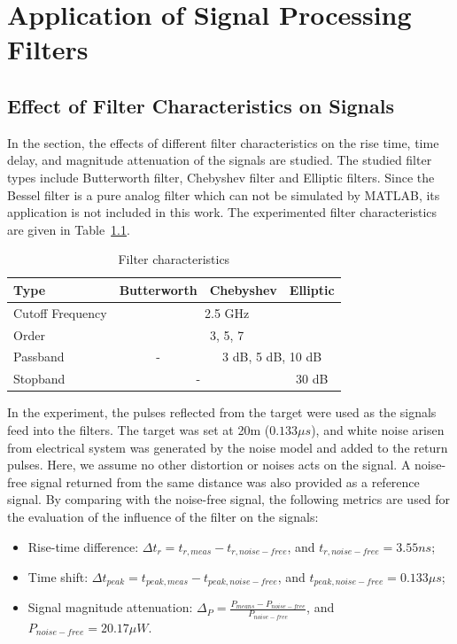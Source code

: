 \chapter{Application of Signal Processing Filters}\label{ch:AFE}
\section{Effect of Filter Characteristics on Signals}
In the section, the effects of different filter characteristics on the rise time, time delay, and magnitude attenuation of the signals are studied. The studied filter types include Butterworth filter, Chebyshev filter and Elliptic filters. Since the Bessel filter is a pure analog filter which can not be simulated by MATLAB, its application is not included in this work. The experimented filter characteristics are given in Table~\ref{table:AFE_filterParam}. 
%
\begin{table}[]
\centering
\caption{Filter characteristics}
\label{table:AFE_filterParam}
\begin{tabular}{|l|c|l|l|}
\hline
Type & \multicolumn{1}{l|}{Butterworth} & Chebyshev & Elliptic \\ \hline
Cutoff Frequency & \multicolumn{3}{c|}{2.5 GHz} \\ \hline
Order & \multicolumn{3}{c|}{3, 5, 7} \\ \hline
Passband & - & \multicolumn{2}{c|}{3 dB, 5 dB, 10 dB} \\ \hline
Stopband & \multicolumn{2}{c|}{-} & \multicolumn{1}{c|}{30 dB} \\ \hline
\end{tabular}
\end{table}
%
In the experiment, the pulses reflected from the target were used as the signals feed into the filters. The target was set at 20m ($0.133\mu s$), and white noise arisen from electrical system was generated by the noise model and added to the return pulses. Here, we assume no other distortion or noises acts on the signal. A noise-free signal returned from the same distance was also provided as a reference signal. By comparing with the noise-free signal, the following metrics are used for the evaluation of the influence of the filter on the signals:
\begin{itemize}
  \item Rise-time difference: $\Delta t_r= t_{r, meas} - t_{r, noise-free}$, and $t_{r, noise-free}=3.55ns$;
  \item Time shift: $\Delta t_{peak} = t_{peak, meas} - t_{peak, noise-free}$, and $t_{peak, noise-free}=0.133\mu s$;
  \item Signal magnitude attenuation: $\Delta_P=\frac{P_{means}-P_{noise-free}}{P_{noise-free}}$, and $P_{noise-free} = 20.17\mu W$.
\end{itemize}
